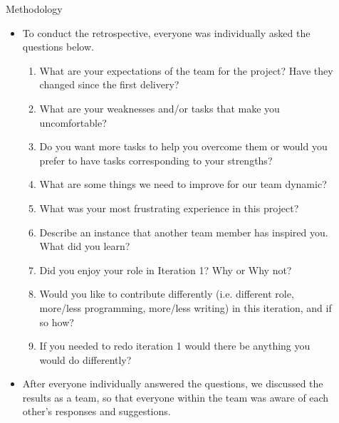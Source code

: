 \documentclass[final,hyperref={pdfpagelabels=false}]{beamer}
\begin{document}
\begin{frame}[t]
\begin{columns}[t]
\begin{column}{.465\textwidth}
            
\begin{block}{Methodology}
\begin{itemize}
\item To conduct the retrospective, everyone was individually asked the questions below. 
\begin{enumerate}
   \item What are your expectations of the team for the project? Have they changed since the first delivery? 
   \item What are your weaknesses and/or tasks that make you uncomfortable?
   \item Do you want more tasks to help you overcome them or would you prefer to have tasks corresponding to your strengths? 
   \item What are some things we need to improve for our team dynamic? 
   \item What was your most frustrating experience in this project?
   \item Describe an instance that another team member has inspired you. What did you learn? 
   \item Did you enjoy your role in Iteration 1? Why or Why not?
   \item Would you like to contribute differently (i.e. different role, more/less programming, more/less writing) in this iteration, and if so how? 
   \item If you needed to redo iteration 1 would there be anything you would do differently?
\end{enumerate}
\item After everyone individually answered the questions, we discussed the results as a team, so that everyone within the team was aware of each other's responses and suggestions.
\end{itemize}
\end{block}


\end{column} %

\begin{column}{.03\textwidth}\end{column} %
 
\begin{column}{.465\textwidth} %



\end{column}
\end{columns}
\end{frame}
\end{document}
